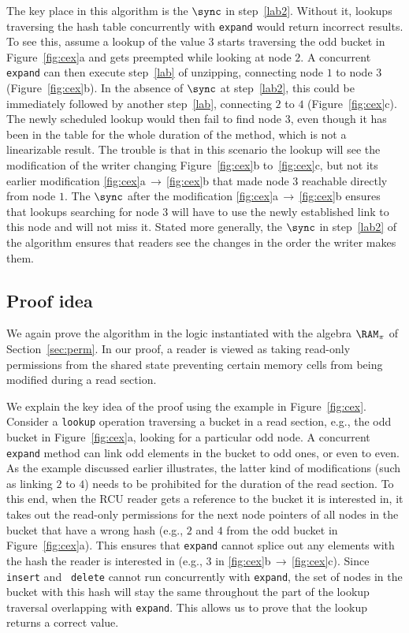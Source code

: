 The key place in this algorithm is the $\sync$ in step~\ref{lab2}. Without it,
lookups traversing the hash table concurrently with {\tt expand} would return
incorrect results. To see this, assume a lookup of the value $3$ starts
traversing the odd bucket in Figure~\ref{fig:cex}a and gets preempted while
looking at node $2$. A concurrent {\tt expand} can then execute step~\ref{lab}
of unzipping, connecting node $1$ to node $3$ (Figure~\ref{fig:cex}b). In the
absence of $\sync$ at step~\ref{lab2}, this could be immediately followed by
another step~\ref{lab}, connecting $2$ to $4$ (Figure~\ref{fig:cex}c). The newly
scheduled lookup would then fail to find node $3$, even though it has been in
the table for the whole duration of the method, which is not a linearizable
result. The trouble is that in this scenario the lookup will see the
modification of the writer changing Figure~\ref{fig:cex}b to~\ref{fig:cex}c, but
not its earlier modification \ref{fig:cex}a$\,\rightarrow\,$\ref{fig:cex}b that
made node $3$ reachable directly from node $1$.  The $\sync$ after the
modification \ref{fig:cex}a$\,\rightarrow\,$\ref{fig:cex}b ensures that lookups
searching for node $3$ will have to use the newly established link to this node
and will not miss it.  Stated more generally, the $\sync$ in step~\ref{lab2} of
the algorithm ensures that readers see the changes in the order the writer makes
them.

\subsection{Proof idea}


We again prove the algorithm in the logic instantiated with the algebra
$\RAM_{\pi}$ of Section~\ref{sec:perm}. In our proof, a reader is viewed as
taking read-only permissions from the shared state preventing certain memory
cells from being modified during a read section.

We explain the key idea of the proof using the example in Figure~\ref{fig:cex}.
Consider a {\tt lookup} operation traversing a bucket in a read section, e.g.,
the odd bucket in Figure~\ref{fig:cex}a, looking for a particular odd node.  A
concurrent {\tt expand} method can link odd elements in the bucket to odd ones,
or even to even. As the example discussed earlier illustrates, the latter kind
of modifications (such as linking $2$ to $4$) needs to be prohibited for the
duration of the read section. To this end, when the RCU reader gets a reference
to the bucket it is interested in, it takes out the read-only permissions for
the next node pointers of all nodes in the bucket that have a wrong hash (e.g.,
$2$ and $4$ from the odd bucket in Figure~\ref{fig:cex}a). This ensures that
{\tt expand} cannot splice out any elements with the hash the reader is
interested in (e.g., $3$ in
\ref{fig:cex}b$\,\rightarrow\,$\ref{fig:cex}c). Since {\tt insert} and {\tt
  delete} cannot run concurrently with {\tt expand}, the set of nodes in the
bucket with this hash will stay the same throughout the part of the lookup
traversal overlapping with {\tt expand}. This allows us to prove that the lookup
returns a correct value.

